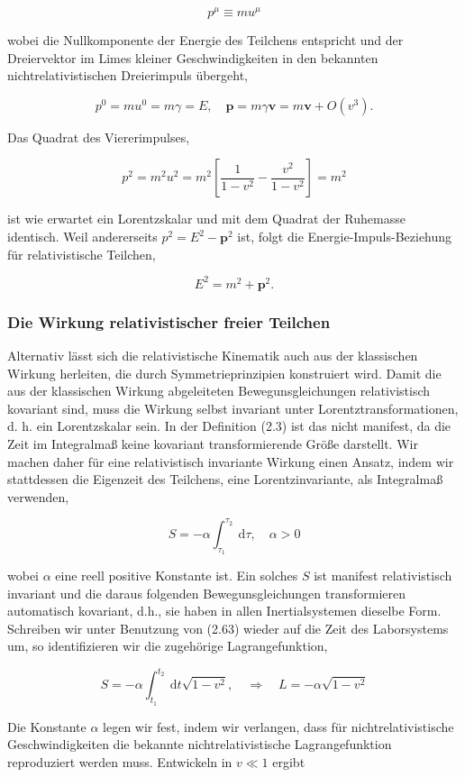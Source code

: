 \documentclass[10pt, letterpaper]{article}
\begin{document}
$$
p^{\mu} \equiv m u^{\mu}
$$

wobei die Nullkomponente der Energie des Teilchens entspricht und der Dreiervektor im Limes kleiner Geschwindigkeiten in den bekannten nichtrelativistischen Dreierimpuls übergeht,

$$
p^{0}=m u^{0}=m \gamma=E, \quad \mathbf{p}=m \gamma \mathbf{v}=m \mathbf{v}+O\left(v^{3}\right) .
$$

Das Quadrat des Viererimpulses,

$$
p^{2}=m^{2} u^{2}=m^{2}\left[\frac{1}{1-v^{2}}-\frac{v^{2}}{1-v^{2}}\right]=m^{2}
$$

ist wie erwartet ein Lorentzskalar und mit dem Quadrat der Ruhemasse identisch. Weil andererseits $p^{2}=E^{2}-\mathbf{p}^{2}$ ist, folgt die Energie-Impuls-Beziehung für relativistische Teilchen,

$$
E^{2}=m^{2}+\mathbf{p}^{2} .
$$

\subsubsection*{Die Wirkung relativistischer freier Teilchen}
Alternativ lässt sich die relativistische Kinematik auch aus der klassischen Wirkung herleiten, die durch Symmetrieprinzipien konstruiert wird. Damit die aus der klassischen Wirkung abgeleiteten Bewegunsgleichungen relativistisch kovariant sind, muss die Wirkung selbst invariant unter Lorentztransformationen, d. h. ein Lorentzskalar sein. In der Definition (2.3) ist das nicht manifest, da die Zeit im Integralmaß keine kovariant transformierende Größe darstellt. Wir machen daher für eine relativistisch invariante Wirkung einen Ansatz, indem wir stattdessen die Eigenzeit des Teilchens, eine Lorentzinvariante, als Integralmaß verwenden,

$$
S=-\alpha \int_{\tau_{1}}^{\tau_{2}} \mathrm{~d} \tau, \quad \alpha>0
$$

wobei $\alpha$ eine reell positive Konstante ist. Ein solches $S$ ist manifest relativistisch invariant und die daraus folgenden Bewegunsgleichungen transformieren automatisch kovariant, d.h., sie haben in allen Inertialsystemen dieselbe Form. Schreiben wir unter Benutzung von (2.63) wieder auf die Zeit des Laborsystems um, so identifizieren wir die zugehörige Lagrangefunktion,

$$
S=-\alpha \int_{t_{1}}^{t_{2}} \mathrm{~d} t \sqrt{1-v^{2}}, \quad \Rightarrow \quad L=-\alpha \sqrt{1-v^{2}}
$$

Die Konstante $\alpha$ legen wir fest, indem wir verlangen, dass für nichtrelativistische Geschwindigkeiten die bekannte nichtrelativistische Lagrangefunktion reproduziert werden muss. Entwickeln in $v \ll 1$ ergibt
\end{document}
